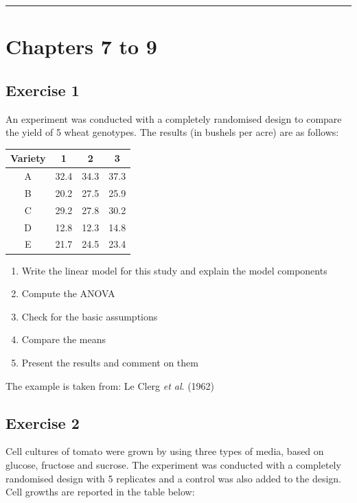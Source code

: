 \documentclass[a4paper,12pt,oneside]{book}
\providecommand{\tightlist}{%
  \setlength{\itemsep}{0pt}\setlength{\parskip}{0pt}}
\begin{document}
\begin{center}\rule{0.5\linewidth}{0.5pt}\end{center}

\hypertarget{chapters-7-to-9}{%
\section{Chapters 7 to 9}\label{chapters-7-to-9}}

\hypertarget{exercise-1-4}{%
\subsection{Exercise 1}\label{exercise-1-4}}

An experiment was conducted with a completely randomised design to compare the yield of 5 wheat genotypes. The results (in bushels per acre) are as follows:

\begin{longtable}[]{@{}cccc@{}}
\toprule
Variety & 1 & 2 & 3 \\
\midrule
\endhead
A & 32.4 & 34.3 & 37.3 \\
B & 20.2 & 27.5 & 25.9 \\
C & 29.2 & 27.8 & 30.2 \\
D & 12.8 & 12.3 & 14.8 \\
E & 21.7 & 24.5 & 23.4 \\
\bottomrule
\end{longtable}

\begin{enumerate}
\def\labelenumi{\arabic{enumi}.}
\tightlist
\item
  Write the linear model for this study and explain the model components
\item
  Compute the ANOVA
\item
  Check for the basic assumptions
\item
  Compare the means
\item
  Present the results and comment on them
\end{enumerate}

The example is taken from: Le Clerg \emph{et al}. (1962)

\hypertarget{exercise-2-4}{%
\subsection{Exercise 2}\label{exercise-2-4}}

Cell cultures of tomato were grown by using three types of media, based on glucose, fructose and sucrose. The experiment was conducted with a completely randomised design with 5 replicates and a control was also added to the design. Cell growths are reported in the table below:
\end{document}
